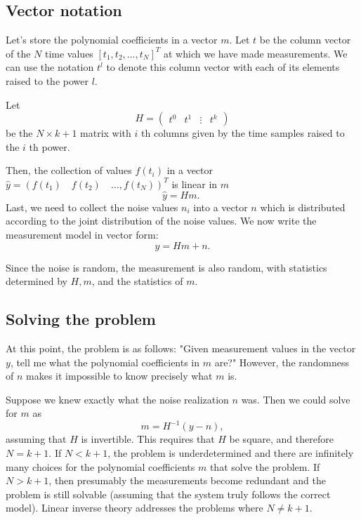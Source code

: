 \documentclass[11pt]{article}
\begin{document}
\subsection{Vector notation}

Let's store the polynomial coefficients in a vector $m$. Let $t$ be the column vector of the $N$ time values $\left[t_{1}, t_{2}, \ldots, t_{N}\right]^{T}$ at which we have made measurements. We can use the notation $t^{l}$ to denote this column vector with each of its elements raised to the power $l$.

Let
\begin{equation}
H=\left(\begin{array}{llll}
	t^{0} & t^{1} & \vdots & t^{k}
\end{array}\right)
\end{equation}
be the $N \times k+1$ matrix with $i$ th columns given by the time samples raised to the $i$ th power.

Then, the collection of values $f\left(t_{i}\right)$ in a vector $\hat{y}=\left(f\left(t_{1}\right) \quad f\left(t_{2}\right) \quad \ldots, f\left(t_{N}\right)\right)^{T}$ is linear in $m$
\begin{equation}
\hat{y}=H m \text {. }
\end{equation}
Last, we need to collect the noise values $n_{i}$ into a vector $n$ which is distributed according to the joint distribution of the noise values. We now write the measurement model in vector form:
\begin{equation}
y=H m+n . 
\end{equation}

Since the noise is random, the measurement is also random, with statistics determined by $H, m$, and the statistics of $m$.

\subsection{Solving the problem}

At this point, the problem is as follows: "Given measurement values in the vector $y$, tell me what the polynomial coefficients in $m$ are?" However, the randomness of $n$ makes it impossible to know precisely what $m$ is.

Suppose we knew exactly what the noise realization $n$ was. Then we could solve for $m$ as
\begin{equation}
m=H^{-1}(y-n),
\end{equation}
assuming that $H$ is invertible. This requires that $H$ be square, and therefore $N=k+1$. If $N<k+1$, the problem is underdetermined and there are infinitely many choices for the polynomial coefficients $m$ that solve the problem. If $N>k+1$, then presumably the measurements become redundant and the problem is still solvable (assuming that the system truly follows the correct model). Linear inverse theory addresses the problems where $N \neq k+1$.
\end{document}
